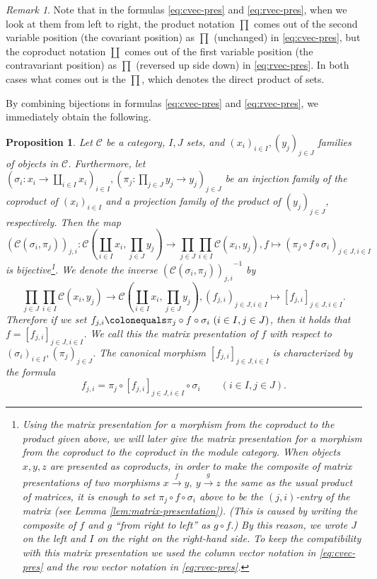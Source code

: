 \documentclass{surv-l}
\numberwithin{equation}{chapter}
\numberwithin{figure}{chapter}
\theoremstyle{plain}
\newtheorem{prp}[thm]{Proposition}
\theoremstyle{definition}
\theoremstyle{remark}
\newtheorem{rmk}[thm]{Remark}
\begin{document}
\begin{rmk}
Note that in the formulas \eqref{eq:cvec-pres} and \eqref{eq:rvec-pres},
when we look at them from left to right,
the product notation $\prod$ comes out of %
the second variable position
(the covariant position) as $\prod$ (unchanged)
in \eqref{eq:cvec-pres}, but
the coproduct notation $\coprod$ comes out of %
the first variable position
(the contravariant position) as $\prod$ (reversed up side down)
in \eqref{eq:rvec-pres}.
In both cases what comes out 
is the $\prod$,
which denotes the direct product of sets.
\end{rmk}

By combining bijections in formulas \eqref{eq:cvec-pres} and \eqref{eq:rvec-pres},
we immediately obtain the following.

\begin{prp}\label{prp:gen-matrix-pres}
Let ${\mathcal{C}}$ be a category, $I, J$ sets, and $(x_i)_{i\in I}, (y_j)_{j\in J}$
families of objects in ${\mathcal{C}}$.
Furthermore, let $(\sigma_i \colon x_i \to \coprod_{i\in I}x_i)_{i\in I},
(\pi_j \colon \prod_{j\in J}y_j \to y_j)_{j\in J}$
be an injection family of the coproduct of $(x_i)_{i\in I}$ and
a projection family of the product of $(y_j)_{j\in J}$, respectively.
Then the map
\[
({\mathcal{C}}(\sigma_i, \pi_j))_{j,i} \colon{\mathcal{C}}(\coprod_{i\in I}x_i, \prod_{j\in J}y_j) \to \prod_{j\in J}\prod_{i\in I}{\mathcal{C}}(x_i, y_j),
f \mapsto (\pi_j\circ f \circ \sigma_i)_{j\in J, i\in I}
\]
is bijective\footnote{Using the matrix presentation for a morphism from the coproduct to the product given above,
we will later give the matrix presentation for a morphism from the coproduct to the {\em coproduct}
in the module category.
When objects $x, y, z$ are presented as coproducts,
in order to make the composite of matrix presentations of two morphisms
$x \xrightarrow{f} y,\ y \xrightarrow{g} z$ the same as the usual product of matrices,
it is enough to set $\pi_j\circ f \circ \sigma_i$ above to be the $(j,i)$-entry of the matrix
(see Lemma \ref{lem:matrix-presentation}).
(This is caused by writing the composite of $f$ and $g$
 ``from right to left'' as $g \circ f$.)
By this reason, we wrote $J$ on the left and $I$ on the right on the right-hand side.
To keep the compatibility with this matrix presentation
we used the column vector notation in \eqref{eq:cvec-pres} and the row vector notation in
\eqref{eq:rvec-pres}.}.
We denote the inverse ${({\mathcal{C}}(\sigma_i, \pi_j))_{j,i}}^{-1} $ by
\[
\prod_{j\in J}\prod_{i\in I}{\mathcal{C}}(x_i, y_j)
\to {\mathcal{C}}(\coprod_{i\in I}x_i, \prod_{j\in J}y_j) ,
(f_{j,i})_{j\in J,i\in I} \mapsto [f_{j,i}]_{j\in J,i\in I}.
\]
Therefore if we set $f_{j,i}\colonequals  \pi_j \circ f \circ \sigma_i \ (i \in I, j\in J)$, then
it holds that $f = [f_{j,i}]_{j\in J,i\in I}$.
We call this the \emph{matrix presentation} of $f$ with respect to
$(\sigma_i)_{i\in I}, (\pi_j)_{j\in J}$.
The canonical morphism $[f_{j,i}]_{j\in J, i\in I}$ is characterized by the formula
\[
f_{j,i} = \pi_j \circ [f_{j,i}]_{j\in J, i\in I} \circ \sigma_i\qquad (i\in I, j \in J).
\]
\end{prp}
\end{document}
